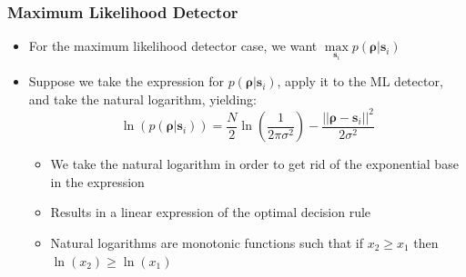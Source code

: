 \documentclass[10pt]{beamer}
\begin{document}
\frame
{
  \frametitle{Maximum Likelihood Detector}

  \begin{itemize}
    \item For the maximum likelihood detector case, we want $\max\limits_{\mathbf{s}_i}{p(\mathbf{\rho}|\mathbf{s}_i)}$
    \item Suppose we take the expression for $p(\mathbf{\rho}|\mathbf{s}_i)$, apply it to the ML detector, and take the natural logarithm, yielding:
    \begin{equation}
        \ln(p(\mathbf{\rho}|\mathbf{s}_i))=\frac{N}{2}\ln\left(\frac{1}{2\pi\sigma^2}\right)-\frac{||\mathbf{\rho}-\mathbf{s}_i||^2}{2\sigma^2}
    \end{equation}
    \begin{itemize}
        \item We take the natural logarithm in order to get rid of the exponential base in the expression
        \item Results in a linear expression of the optimal decision rule
        \item Natural logarithms are monotonic functions such that if $x_2\ge{x_1}$ then $\ln(x_2)\ge\ln(x_1)$
    \end{itemize}
  \end{itemize}

}
\end{document}
